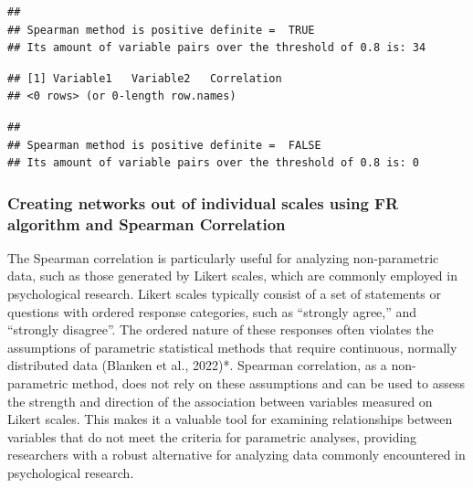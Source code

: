 \documentclass[
]{article}
\newenvironment{Shaded}{\begin{snugshade}}{\end{snugshade}}
\newcommand{\DecValTok}[1]{\textcolor[rgb]{0.00,0.00,0.81}{#1}}
\newcommand{\FunctionTok}[1]{\textcolor[rgb]{0.13,0.29,0.53}{\textbf{#1}}}
\newcommand{\NormalTok}[1]{#1}
\newcommand{\OtherTok}[1]{\textcolor[rgb]{0.56,0.35,0.01}{#1}}
\newcommand{\SpecialCharTok}[1]{\textcolor[rgb]{0.81,0.36,0.00}{\textbf{#1}}}
\newcommand{\StringTok}[1]{\textcolor[rgb]{0.31,0.60,0.02}{#1}}
\begin{document}
\begin{verbatim}
## 
## Spearman method is positive definite =  TRUE 
## Its amount of variable pairs over the threshold of 0.8 is: 34
\end{verbatim}

\begin{Shaded}
\end{Shaded}

\begin{verbatim}
## [1] Variable1   Variable2   Correlation
## <0 rows> (or 0-length row.names)
\end{verbatim}

\begin{Shaded}
\end{Shaded}

\begin{verbatim}
## 
## Spearman method is positive definite =  FALSE 
## Its amount of variable pairs over the threshold of 0.8 is: 0
\end{verbatim}

\subsubsection{Creating networks out of individual scales using FR
algorithm and Spearman
Correlation}\label{creating-networks-out-of-individual-scales-using-fr-algorithm-and-spearman-correlation}

The Spearman correlation is particularly useful for analyzing
non-parametric data, such as those generated by Likert scales, which are
commonly employed in psychological research. Likert scales typically
consist of a set of statements or questions with ordered response
categories, such as ``strongly agree,'' and ``strongly disagree''. The
ordered nature of these responses often violates the assumptions of
parametric statistical methods that require continuous, normally
distributed data (Blanken et al., 2022)*. Spearman correlation, as a
non-parametric method, does not rely on these assumptions and can be
used to assess the strength and direction of the association between
variables measured on Likert scales. This makes it a valuable tool for
examining relationships between variables that do not meet the criteria
for parametric analyses, providing researchers with a robust alternative
for analyzing data commonly encountered in psychological research.
\end{document}
